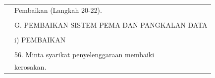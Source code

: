 \documentclass[
]{article}
\begin{document}
\begin{longtable}[]{@{}ll@{}}
\begin{minipage}[t]{0.23\columnwidth}
\strut
\end{minipage} & \begin{minipage}[t]{0.71\columnwidth}\raggedright
Pembaikan (Langkah 20-22).\strut
\end{minipage}\tabularnewline
\begin{minipage}[t]{0.23\columnwidth}\raggedright
\strut
\end{minipage} & \begin{minipage}[t]{0.71\columnwidth}\raggedright
\strut
\end{minipage}\tabularnewline
\begin{minipage}[t]{0.23\columnwidth}\raggedright
\strut
\end{minipage} & \begin{minipage}[t]{0.71\columnwidth}\raggedright
G. PEMBAIKAN SISTEM PEMA DAN PANGKALAN DATA\strut
\end{minipage}\tabularnewline
\begin{minipage}[t]{0.23\columnwidth}\raggedright
\strut
\end{minipage} & \begin{minipage}[t]{0.71\columnwidth}\raggedright
\strut
\end{minipage}\tabularnewline
\begin{minipage}[t]{0.23\columnwidth}\raggedright
\strut
\end{minipage} & \begin{minipage}[t]{0.71\columnwidth}\raggedright
i) PEMBAIKAN\strut
\end{minipage}\tabularnewline
\begin{minipage}[t]{0.23\columnwidth}\raggedright
\strut
\end{minipage} & \begin{minipage}[t]{0.71\columnwidth}\raggedright
\strut
\end{minipage}\tabularnewline
\begin{minipage}[t]{0.23\columnwidth}\raggedright
\strut
\end{minipage} & \begin{minipage}[t]{0.71\columnwidth}\raggedright
56. Minta syarikat penyelenggaraan membaiki\strut
\end{minipage}\tabularnewline
\begin{minipage}[t]{0.23\columnwidth}\raggedright
\strut
\end{minipage} & \begin{minipage}[t]{0.71\columnwidth}\raggedright
kerosakan.\strut
\end{minipage}\tabularnewline

\end{longtable}
\end{document}
